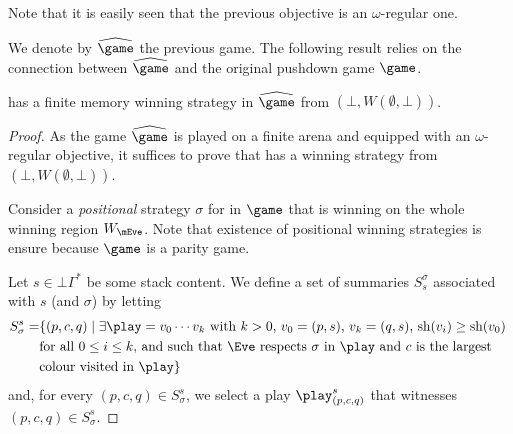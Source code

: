 Note that it is easily seen that the previous objective is an $\omega$-regular one. 


We denote by $\hgame$ the previous game. The following result relies on the connection between $\hgame$ and the original pushdown game $\game$.

\begin{theorem}\label{10-thm:hgame}
	\Eve has a finite memory winning strategy in $\hgame$ from $(\bot,W(\emptyset,\bot))$.
\end{theorem}

\begin{proof}
	As the game $\hgame$ is played on a finite arena and equipped with an $\omega$-regular objective, it suffices to prove that \Eve has a winning strategy from $(\bot,W(\emptyset,\bot))$.

	Consider a \emph{positional} strategy $\sigma$ for \Eve in $\game$ that is winning on the whole winning region $W_\mEve$. Note that existence of positional winning strategies is ensure because $\game$ is a parity game.
	
	Let $s\in\bot\Gamma^*$ be some stack content. We define a set of summaries $S_s^\sigma$ associated with $s$ (and $\sigma$) by letting 
	\begin{equation*}
	\begin{split}
	S^s_\sigma=& \{(p,c,q) \mid \exists \play=v_0\cdots v_k \text{ with $k>0$, $v_0=(p,s)$, $v_k=(q,s)$, $\sh(v_i)\geq \sh(v_0)$ }\\  & \text{for all $0\leq i\leq k$, and such that \Eve respects $\sigma$ in $\play$ and $c$ is the largest}\\ & \text{colour visited in $\play$}\}
	\end{split}
	\end{equation*}	
	and, for every $(p,c,q)\in S^s_\sigma$, we select a play $\play_{(p,c,q)}^s$ that witnesses $(p,c,q)\in S_\sigma^s$. 
	

\end{proof}
